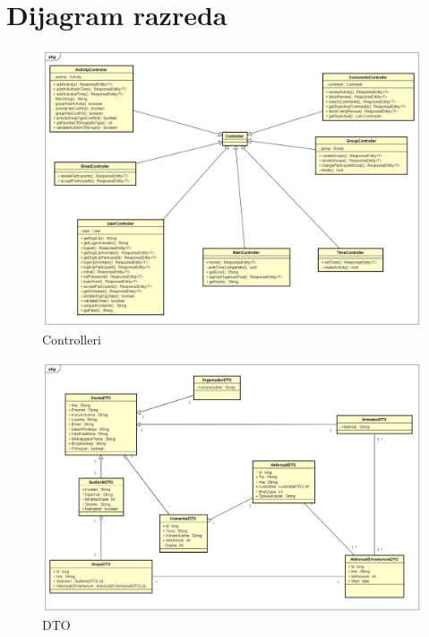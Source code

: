 \eject


\section{Dijagram razreda}

\begin{figure}[H]
	\includegraphics[scale=0.3]{dijagrami/Controllers.png} %
	\centering
	\caption{Controlleri}
	\label{fig:promjene}
\end{figure}

\begin{figure}[H]
    \includegraphics[scale=0.3]{dokumentacija/dijagrami/dto.jpeg} %
	\centering
	\caption{DTO}
	\label{fig:promjene}
\end{figure}


